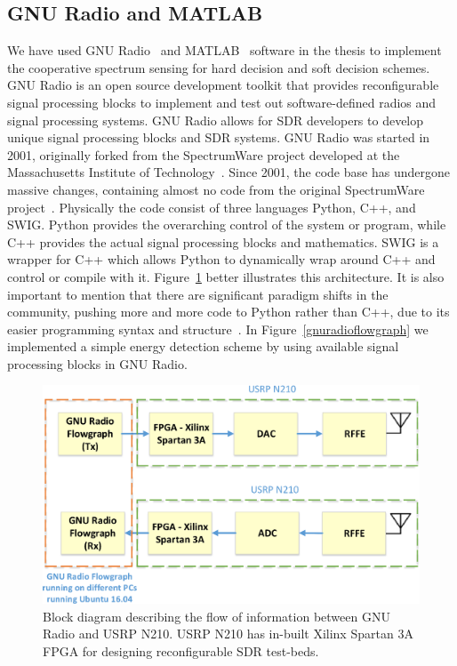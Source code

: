 \subsection{GNU Radio and MATLAB}
We have used GNU Radio~\cite{gnradio} and MATLAB~\cite{matlab} software in the thesis to implement the cooperative spectrum sensing for hard decision and soft decision schemes. GNU Radio is an open source development toolkit that provides reconfigurable signal processing blocks to implement and test out software-defined radios and signal processing systems. GNU Radio allows for SDR developers to develop unique signal processing blocks and SDR systems. GNU Radio was started in 2001, originally forked from the SpectrumWare project developed at the Massachusetts Institute of Technology~\cite{Tennenhouse:1995:SSA:215530.215551}. Since 2001, the code base has undergone massive changes, containing almost no code from the original SpectrumWare project~\cite{bose1999virtual}. Physically the code consist of three languages Python, C++, and SWIG. Python provides the overarching control of the system or program, while C++ provides the actual signal processing blocks and mathematics. SWIG is a wrapper for C++ which allows Python to dynamically wrap around C++ and control or compile with it. Figure~\ref{gnuradio} better illustrates this architecture. It is also important to mention that there are significant paradigm shifts in the community, pushing more and more code to Python rather than C++, due to its easier programming syntax and structure~\cite{collins2013implementation}. In Figure~\ref{gnuradioflowgraph} we implemented a simple energy detection scheme by using available signal processing blocks in GNU Radio.

\begin{figure}[ht!]
	\centering
	\includegraphics[width=\textwidth,keepaspectratio]{images/Gill/figs/gnuradio.eps}
    \caption{Block diagram describing the flow of information between GNU Radio and USRP N210. USRP N210 has in-built Xilinx Spartan 3A FPGA for designing reconfigurable SDR test-beds.} 
\label{gnuradio}      
\end{figure}

